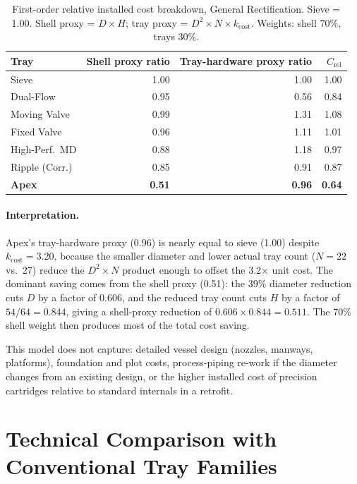 \documentclass[11pt,letterpaper]{article}
\begin{document}
\begin{table}[H]
\centering
\caption{First-order relative installed cost breakdown, General Rectification.
  Sieve = 1.00.  Shell proxy = $D\times H$; tray proxy = $D^2\times N\times k_{\mathrm{cost}}$.
  Weights: shell 70\%, trays 30\%.}
\label{tab:cost}
\small
\begin{tabular}{lrrr}
\toprule
Tray & Shell proxy ratio & Tray-hardware proxy ratio & $C_{\mathrm{rel}}$\\
\midrule
Sieve              & 1.00 & 1.00 & 1.00\\
Dual-Flow          & 0.95 & 0.56 & 0.84\\
Moving Valve       & 0.99 & 1.31 & 1.08\\
Fixed Valve        & 0.96 & 1.11 & 1.01\\
High-Perf.\ MD     & 0.88 & 1.18 & 0.97\\
Ripple (Corr.)     & 0.85 & 0.91 & 0.87\\
\textbf{Apex}      & \textbf{0.51} & \textbf{0.96} & \textbf{0.64}\\
\bottomrule
\end{tabular}
\end{table}

\paragraph{Interpretation.}
Apex's tray-hardware proxy (0.96) is nearly equal to sieve (1.00) despite
$k_{\mathrm{cost}} = 3.20$, because the smaller diameter and lower actual
tray count ($N=22$ vs.\ 27) reduce the $D^2\times N$ product enough to
offset the 3.2$\times$ unit cost.  The dominant saving comes from the shell
proxy (0.51): the 39\% diameter reduction cuts $D$ by a factor of 0.606,
and the reduced tray count cuts $H$ by a factor of $54/64 = 0.844$, giving
a shell-proxy reduction of $0.606\times0.844 = 0.511$.  The 70\% shell
weight then produces most of the total cost saving.

This model does not capture: detailed vessel design (nozzles, manways,
platforms), foundation and plot costs, process-piping re-work if the
diameter changes from an existing design, or the higher installed cost of
precision cartridges relative to standard internals in a retrofit.

\section{Technical Comparison with Conventional Tray Families}
\label{sec:comparison}
\end{document}
